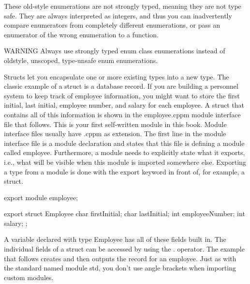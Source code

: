 These old-style enumerations are not strongly typed, meaning they are not type safe. They are always interpreted as integers, and thus you can inadvertently compare enumerators from completely different enumerations, or pass an enumerator of the wrong enumeration to a function.

\begin{myWarning}{WARNING}
Always use strongly typed enum class enumerations instead of oldstyle, unscoped, type-unsafe enum enumerations.
\end{myWarning}


Structs let you encapsulate one or more existing types into a new type. The classic example of a struct is a database record. If you are building a personnel system to keep track of employee information, you might want to store the first initial, last initial, employee number, and salary for each employee. A struct that contains all of this information is shown in the employee.cppm module interface file that follows. This is your first self-written module in this book. Module interface files usually have .cppm as extension. The first line in the module interface file is a module declaration and states that this file is defining a module called employee. Furthermore, a module needs to explicitly state what it exports, i.e., what will be visible when this module is imported somewhere else. Exporting a type from a module is done with the export keyword in front of, for example, a struct.

\begin{cpp}
export module employee;

export struct Employee {
    char firstInitial;
    char lastInitial;
    int employeeNumber;
    int salary;
};
\end{cpp}

A variable declared with type Employee has all of these fields built in. The individual fields of a struct can be accessed by using the . operator. The example that follows creates and then outputs the record for an employee. Just as with the standard named module std, you don’t use angle brackets when importing custom modules.


